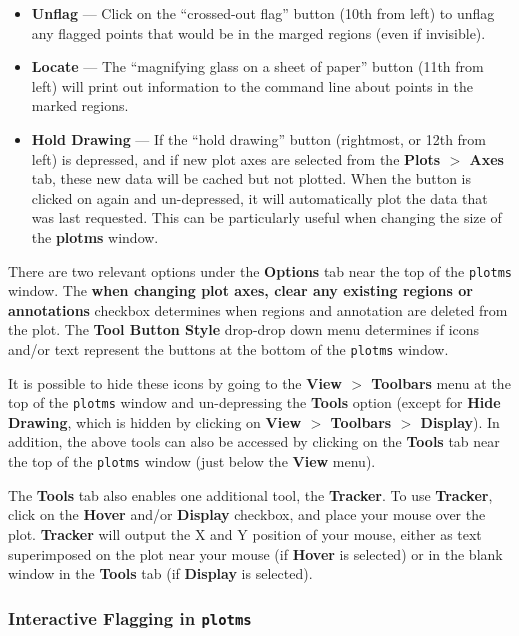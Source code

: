 \begin{itemize}
\item {\bf Unflag} --- Click on the ``crossed-out flag'' button (10th from left) to unflag any flagged points that would be in the marged regions (even if invisible).

\item {\bf Locate} --- The ``magnifying glass on a sheet of paper'' button (11th from left) will print out information to the command line about points in the marked regions.  

\item {\bf Hold Drawing} --- If the ``hold drawing'' button (rightmost, or 12th from left) is depressed, and if new plot axes are selected from the {\bf Plots $>$ Axes} tab, these new data will be cached but not plotted. When the button is clicked on again and un-depressed, it will automatically plot the data that was last requested. This can be particularly useful when changing the size of the {\bf plotms} window.
\end{itemize}

There are two relevant options under the {\bf Options} tab near the top of the {\tt plotms} window. The {\bf when changing plot axes, clear any existing regions or annotations} checkbox determines when regions and annotation are deleted from the plot. The {\bf Tool Button Style} drop-drop down menu determines if icons and/or text represent the buttons at the bottom of the {\tt plotms} window. 

It is possible to hide these icons by going to the {\bf View $>$ Toolbars} menu at the top of the {\tt plotms} window and un-depressing the {\bf Tools} option (except for {\bf Hide Drawing}, which is hidden by clicking on {\bf View $>$ Toolbars $>$ Display}). In addition, the above tools can also be accessed by clicking on the {\bf Tools} tab near the top of the {\tt plotms} window (just below the {\bf View} menu). 

The {\bf Tools} tab also enables one additional tool, the {\bf Tracker}. To use {\bf Tracker}, click on the {\bf Hover} and/or {\bf Display} checkbox, and place your mouse over the plot. {\bf Tracker} will output the X and Y position of your mouse, either as text superimposed on the plot near your mouse (if {\bf Hover} is selected) or in the blank window in the {\bf Tools} tab (if {\bf Display} is selected).



\subsubsection{Interactive Flagging in {\tt plotms}}
\label{section:edit.plot.plotms.flag}


